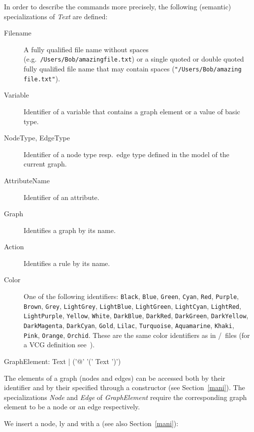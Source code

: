 In order to describe the commands more precisely, the following (semantic) specializations of \emph{Text} are defined:
\begin{description}
  \item[Filename]A fully qualified file name without spaces (e.g.\ \texttt{/Users/Bob/amazing\textunderscore file.txt}) or a single quoted or double quoted fully qualified file name that may contain spaces (\texttt{"/Users/Bob/amazing file.txt"}).
  \item[Variable] Identifier of a variable that contains a graph element or a value of basic type. 
  \item[NodeType, EdgeType] Identifier of a node type resp.\ edge type defined in the model of the current graph.
  \item[AttributeName] Identifier of an attribute.
  \item[Graph] Identifies a graph by its name.
  \item[Action] Identifies a rule by its name.
  \item[Color] One of the following  identifiers: \texttt{Black}, \texttt{Blue}, \texttt{Green}, \texttt{Cyan}, \texttt{Red}, \texttt{Purple}, \texttt{Brown}, \texttt{Grey}, \texttt{LightGrey}, \texttt{LightBlue}, \texttt{LightGreen}, \texttt{LightCyan}, \texttt{LightRed}, \texttt{LightPurple}, \texttt{Yel\-low}, \texttt{White}, \texttt{DarkBlue}, \texttt{DarkRed}, \texttt{DarkGreen}, \texttt{DarkYellow}, \texttt{DarkMagenta}, \texttt{DarkCyan}, \texttt{Gold}, \texttt{Lilac}, \texttt{Turquoise}, \texttt{Aquamarine}, \texttt{Khaki}, \texttt{Pink}, \texttt{Orange}, \texttt{Orchid}. These are the same color identifiers as in /\yComp\ files (for a VCG definition see~\cite{vcg}).
\end{description}
\makeatletter
\begin{rail}
  GraphElement: Text | ('@' '(' Text ')')
\end{rail}
\makeatother
The elements of a graph (nodes and edges) can be accessed both by their  identifier and by their  specified through a constructor (see Section~\ref{mani}).
The specializations \emph{Node} and \emph{Edge} of \emph{GraphElement} require the corresponding graph element to be a node or an edge respectively.
\begin{example}
\label{persistentex} 
We insert a node, ly and with a  (see also Section~\ref{mani}):
\end{example}
